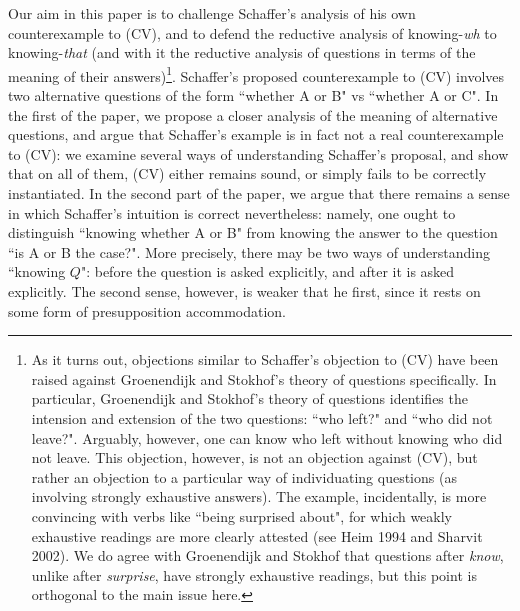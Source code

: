 Our aim in this paper is to challenge Schaffer's analysis of his
own counterexample to (CV), and to defend the reductive analysis
of knowing-\emph{wh} to knowing-\emph{that} (and with it the
reductive analysis of questions in terms of the meaning of their
answers)\footnote{As it turns out, objections similar to
Schaffer's objection to (CV) have been raised against Groenendijk
and Stokhof's theory of questions specifically. In particular,
Groenendijk and Stokhof's theory of questions identifies the
intension and extension of the two questions: ``who left?" and
``who did not leave?". Arguably, however, one can know who left
without knowing who did not leave. This objection, however, is not
an objection against (CV), but rather an objection to a particular
way of individuating questions (as involving strongly exhaustive
answers). The example, incidentally, is more convincing with verbs
like ``being surprised about", for which weakly exhaustive
readings are more clearly attested (see Heim 1994 and Sharvit
2002). We do agree with Groenendijk and Stokhof that questions
after \emph{know}, unlike after \emph{surprise}, have strongly
exhaustive readings, but this point is orthogonal to the main
issue here.}. Schaffer's proposed counterexample to (CV) involves
two alternative questions of the form ``whether A or B" vs
``whether A or C". In the first of the paper, we propose a closer
analysis of the meaning of alternative questions, and argue that
Schaffer's example is in fact not a real counterexample to (CV):
we examine several ways of understanding Schaffer's proposal, and
show that on all of them, (CV) either remains sound, or simply
fails to be correctly instantiated. In the second part of the
paper, we argue that there remains a sense in which Schaffer's
intuition is correct nevertheless: namely, one ought to
distinguish ``knowing whether A or B" from knowing the answer to
the question ``is A or B the case?". More precisely, there may be
two ways of understanding ``knowing $Q$": before the question is
asked explicitly, and after it is asked explicitly. The second
sense, however, is weaker that he first, since it rests on some
form of presupposition accommodation.

